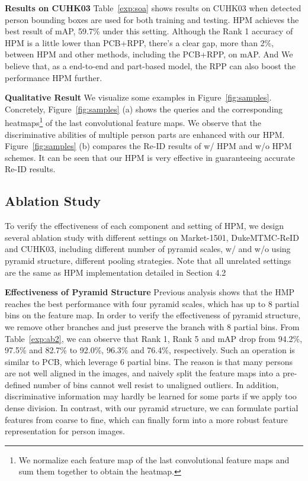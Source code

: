 \documentclass[letterpaper]{article} \usepackage{aaai19}  \usepackage{times}  \usepackage{helvet}  \usepackage{courier}  \usepackage{url}  \usepackage{graphicx}  \frenchspacing  \setlength{\pdfpagewidth}{8.5in}  \setlength{\pdfpageheight}{11in}  \usepackage{multirow}
\begin{document}
{\bf Results on CUHK03} Table~\ref{exp:soa} shows results on CUHK03 when detected person bounding boxes are used for both training and testing. HPM achieves the best result of mAP, 59.7\% under this setting. Although the Rank 1 accuracy of HPM is a little lower than PCB+RPP, there's a clear gap, more than 2\%, between HPM and other methods, including the PCB+RPP, on mAP.  And We believe that, as a end-to-end and part-based model, the RPP can also boost the performance HPM further.

{\bf Qualitative Result} We visualize some examples in Figure~\ref{fig:samples}. Concretely, Figure~\ref{fig:samples} (a) shows the queries and the corresponding heatmaps\footnote{We normalize each feature map of the last convolutional feature maps and sum them together to obtain the heatmap.} of the last convolutional feature maps. We observe that the discriminative abilities of multiple person parts are enhanced with our HPM. Figure~\ref{fig:samples} (b) compares the Re-ID results of w/ HPM and w/o HPM schemes. It can be seen that our HPM is very effective in guaranteeing accurate Re-ID results.


\subsection{Ablation Study}
To verify the effectiveness of each component and setting of HPM, we design several ablation study with different settings on Market-1501, DukeMTMC-ReID and CUHK03, including different number of pyramid scales, w/ and w/o using pyramid structure, different pooling strategies. Note that all unrelated settings are the same as HPM implementation detailed in Section 4.2

{\bf Effectiveness of Pyramid Structure}
Previous analysis shows that the HMP reaches the best performance with four pyramid scales, which has up to 8 partial bins on the feature map. In order to verify the effectiveness of pyramid structure, we remove other branches and just preserve the branch with 8 partial bins. From Table~\ref{exp:ab2}, we can observe that Rank 1, Rank 5 and mAP drop from 94.2\%, 97.5\% and 82.7\% to 92.0\%, 96.3\% and 76.4\%, respectively. Such an operation is similar to PCB, which leverage 6 partial bins. The reason is that many persons are not well aligned in the images, and naively split the feature maps into a pre-defined number of bins cannot well resist to unaligned outliers. In addition, discriminative information may hardly be learned for some parts if we apply too dense division. In contrast, with our pyramid structure, we can formulate partial features from coarse to fine, which can finally form into a more robust feature representation for person images.
\end{document}
